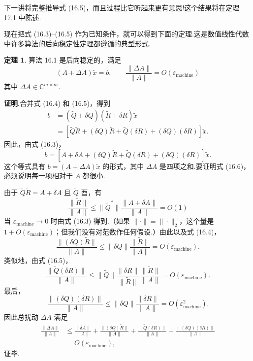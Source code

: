 \documentclass[UTF8,fontset=none,12pt]{ctexart}
\newcommand{\C}{\mathbb{C}}
\newcommand{\epsmach}{\varepsilon_{\mathrm{machine}}}
\theoremstyle{definition}
\newtheorem{theorem}{定理}
\begin{document}
下一讲将完整推导式 (16.5)，而且过程比它听起来更有意思!这个结果将在定理 17.1 中陈述.

现在把式 (16.3)--(16.5) 作为已知条件，就可以得到下面的定理.这是数值线性代数中许多算法的后向稳定性定理都遵循的典型形式.

\begin{theorem}
算法 16.1 是后向稳定的，满足
\begin{equation}
    (A+\Delta A)\widetilde x=b,
    \qquad
    \frac{\|\Delta A\|}{\|A\|}
    =O(\epsmach)
    \tag{16.6}
\end{equation}
其中 $\Delta A\in\C^{m\times m}$.
\end{theorem}

\textbf{证明.}合并式 (16.4) 和 (16.5)，得到
\[
\begin{aligned}
b
&=(\widetilde Q+\delta Q)(\widetilde R+\delta R)\widetilde x\\
&=[\widetilde Q\widetilde R+(\delta Q)\widetilde R
  +\widetilde Q(\delta R)+(\delta Q)(\delta R)]\widetilde x.
\end{aligned}
\]
因此，由式 (16.3)，
\[
    b=
    [A+\delta A+(\delta Q)\widetilde R
    +\widetilde Q(\delta R)+(\delta Q)(\delta R)]\widetilde x.
\]
这个等式具有 $b=(A+\Delta A)\widetilde x$ 的形式，其中 $\Delta A$ 是四项之和.要证明式 (16.6)，必须说明每一项相对于 $A$ 都很小.

由于 $\widetilde Q\widetilde R=A+\delta A$ 且 $\widetilde Q$ 酉，有
\[
    \frac{\|\widetilde R\|}{\|A\|}
    \le
    \|\widetilde Q^*\|
    \frac{\|A+\delta A\|}{\|A\|}
    =O(1)
\]
当 $\epsmach\to0$ 时由式 (16.3) 得到.（如果 $\|\cdot\|=\|\cdot\|_2$，这个量是 $1+O(\epsmach)$；但我们没有对范数作任何假设.）由此以及式 (16.4)，
\[
    \frac{\|(\delta Q)\widetilde R\|}{\|A\|}
    \le
    \|\delta Q\|\frac{\|\widetilde R\|}{\|A\|}
    =O(\epsmach).
\]
类似地，由式 (16.5)，
\[
    \frac{\|\widetilde Q(\delta R)\|}{\|A\|}
    \le
    \|\widetilde Q\|
    \frac{\|\delta R\|}{\|\widetilde R\|}
    \frac{\|\widetilde R\|}{\|A\|}
    =O(\epsmach).
\]
最后，
\[
    \frac{\|(\delta Q)(\delta R)\|}{\|A\|}
    \le
    \|\delta Q\|\frac{\|\delta R\|}{\|A\|}
    =O(\epsmach^2).
\]
因此总扰动 $\Delta A$ 满足
\[
\begin{aligned}
\frac{\|\Delta A\|}{\|A\|}
&\le
\frac{\|\delta A\|}{\|A\|}
+\frac{\|(\delta Q)\widetilde R\|}{\|A\|}
+\frac{\|\widetilde Q(\delta R)\|}{\|A\|}
+\frac{\|(\delta Q)(\delta R)\|}{\|A\|}\\
&=O(\epsmach),
\end{aligned}
\]
证毕.
\end{document}

